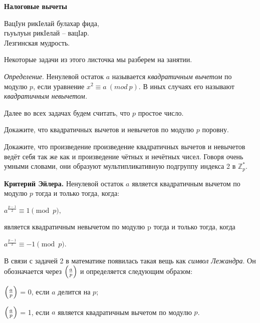 \hspace{3mm}

\centerline{\bf \Huge Налоговые вычеты}

\begin{flushright}
    \scriptsize{ВацIун рикIелай булахар фида,
                \\ гьуьлуьн рикIелай – вацIар.
                \\Лезгинская мудрость.}
\end{flushright}

Некоторые задачи из этого листочка мы разберем на занятии.

\textit{Определение}. 
Ненулевой остаток $a$ называется \textit{квадратичным вычетом} по модулю $p$, если уравнение $x^2 \equiv a \ (mod \ p)$. В иных случаях его называют \textit{квадратичным невычетом.} 

Далее во всех задачах будем считать, что $p$ простое число.

Докажите, что квадратичных вычетов и невычетов по модулю $p$ поровну.

Докажите, что произведение произведение квадратичных вычетов и невычетов ведёт себя так же как и произведение чётных и нечётных чисел. Говоря очень умными словами, они образуют мультипликативную подгруппу индекса 2 в $\mathbb{Z}_p^*$.

\textbf{Критерий Эйлера.} Ненулевой остаток $a$ является квадратичным вычетом по модулю $p$ тогда и только тогда, когда:

${\displaystyle a^{\frac {p-1}{2}}\equiv 1{\pmod {p}},}$

 является квадратичным невычетом по модулю p тогда и только тогда, когда

${\displaystyle a^{\frac {p-1}{2}}\equiv -1{\pmod {p}}.}$

В связи с задачей 2 в математике появилась такая вещь как \textit{символ Лежандра}. Он обозначается через ${\displaystyle \textstyle \left({\frac {a}{p}}\right)}$ и определяется следующим образом:

${\displaystyle \textstyle \left({\frac {a}{p}}\right)}$ = 0, 
если $a$ делится на $p$;

\hspace{3mm}

${\displaystyle \textstyle \left({\frac {a}{p}}\right)}$ = 1,
если $a$ является квадратичным вычетом по модулю $p$.

\hspace{3mm}

